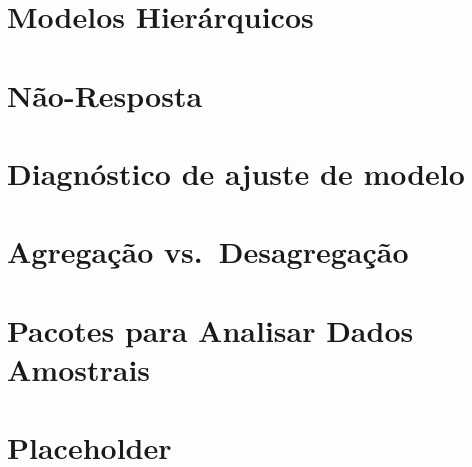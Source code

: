 \documentclass[]{book}
\numberwithin{example}{chapter}
\numberwithin{remark}{chapter}
\numberwithin{definition}{chapter}
\begin{document}
\chapter{Modelos Hierárquicos}\label{modelos-hierarquicos}

\chapter{Não-Resposta}\label{nao-resposta}

\chapter{Diagnóstico de ajuste de
modelo}\label{diagnostico-de-ajuste-de-modelo}

\chapter{Agregação vs.~Desagregação}\label{agregdesag}

\chapter{Pacotes para Analisar Dados Amostrais}\label{pacotes}

\chapter{Placeholder}\label{placeholder}


\end{document}
